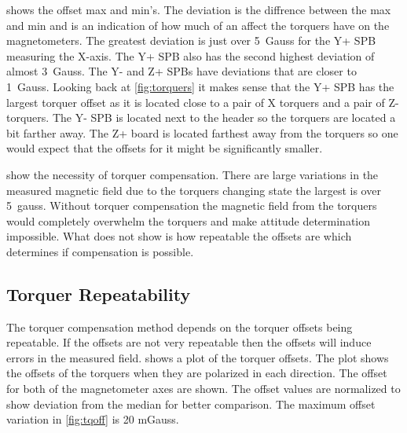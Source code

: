  shows the offset max and min's. The deviation is the diffrence between the max and min and is an indication of how much of an affect the torquers have on the magnetometers. The greatest deviation is just over 5~Gauss for the Y+ \ac{SPB} measuring the X-axis. The Y+ \ac{SPB} also has the second highest deviation of almost 3~Gauss. The Y- and Z+ \acp{SPB} have deviations that are closer to 1~Gauss. Looking back at \cref{fig:torquers} it makes sense that the Y+ \ac{SPB} has the largest torquer offset as it is located close to a pair of X torquers and a pair of Z-torquers. The Y- \ac{SPB} is located next to the header so the torquers are located a bit farther away. The Z+ board is located farthest away from the torquers so one would expect that the offsets for it might be significantly smaller.


 show the necessity of torquer compensation. There are large variations in the measured magnetic field due to the torquers changing state the largest is over 5~gauss. Without torquer compensation the magnetic field from the torquers would completely overwhelm the torquers and make attitude determination impossible. What  does not show is how repeatable the offsets are which determines if compensation is possible.

\subsection{Torquer Repeatability}


The torquer compensation method depends on the torquer offsets being repeatable. If the offsets are not very repeatable then the offsets will induce errors in the measured field.  shows a plot of the torquer offsets. The plot shows the offsets of the torquers when they are polarized in each direction. The offset for both of the magnetometer axes are shown. The offset values are normalized to show deviation from the median for better comparison. The maximum offset variation in \cref{fig:tqoff} is 20 mGauss.



